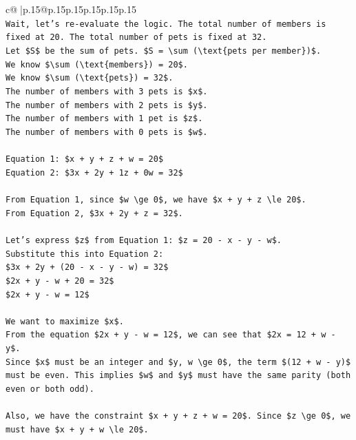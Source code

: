 \documentclass{article}
\begin{document}
{\begin{supertabular}{c@{$\;$}|p{.15\linewidth}@{}p{.15\linewidth}p{.15\linewidth}p{.15\linewidth}p{.15\linewidth}p{.15\linewidth}}
{{{\\ 
\texttt{Wait, let's re{-}evaluate the logic. The total number of members is fixed at 20. The total number of pets is fixed at 32.} \\
\texttt{Let \$S\$ be the sum of pets. \$S = \textbackslash{}sum (\textbackslash{}text\{pets per member\})\$.} \\
\texttt{We know \$\textbackslash{}sum (\textbackslash{}text\{members\}) = 20\$.} \\
\texttt{We know \$\textbackslash{}sum (\textbackslash{}text\{pets\}) = 32\$.} \\
\texttt{The number of members with 3 pets is \$x\$.} \\
\texttt{The number of members with 2 pets is \$y\$.} \\
\texttt{The number of members with 1 pet is \$z\$.} \\
\texttt{The number of members with 0 pets is \$w\$.} \\
\\ 
\texttt{Equation 1: \$x + y + z + w = 20\$} \\
\texttt{Equation 2: \$3x + 2y + 1z + 0w = 32\$} \\
\\ 
\texttt{From Equation 1, since \$w \textbackslash{}ge 0\$, we have \$x + y + z \textbackslash{}le 20\$.} \\
\texttt{From Equation 2, \$3x + 2y + z = 32\$.} \\
\\ 
\texttt{Let's express \$z\$ from Equation 1: \$z = 20 {-} x {-} y {-} w\$.} \\
\texttt{Substitute this into Equation 2:} \\
\texttt{\$3x + 2y + (20 {-} x {-} y {-} w) = 32\$} \\
\texttt{\$2x + y {-} w + 20 = 32\$} \\
\texttt{\$2x + y {-} w = 12\$} \\
\\ 
\texttt{We want to maximize \$x\$.} \\
\texttt{From the equation \$2x + y {-} w = 12\$, we can see that \$2x = 12 + w {-} y\$.} \\
\texttt{Since \$x\$ must be an integer and \$y, w \textbackslash{}ge 0\$, the term \$(12 + w {-} y)\$ must be even. This implies \$w\$ and \$y\$ must have the same parity (both even or both odd).} \\
\\ 
\texttt{Also, we have the constraint \$x + y + z + w = 20\$. Since \$z \textbackslash{}ge 0\$, we must have \$x + y + w \textbackslash{}le 20\$.} \\
}}}
\end{supertabular}}
\end{document}
